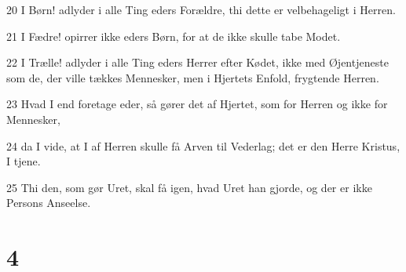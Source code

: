 \par 20 I Børn! adlyder i alle Ting eders Forældre, thi dette er velbehageligt i Herren.
\par 21 I Fædre! opirrer ikke eders Børn, for at de ikke skulle tabe Modet.
\par 22 I Trælle! adlyder i alle Ting eders Herrer efter Kødet, ikke med Øjentjeneste som de, der ville tækkes Mennesker, men i Hjertets Enfold, frygtende Herren.
\par 23 Hvad I end foretage eder, så gører det af Hjertet, som for Herren og ikke for Mennesker,
\par 24 da I vide, at I af Herren skulle få Arven til Vederlag; det er den Herre Kristus, I tjene.
\par 25 Thi den, som gør Uret, skal få igen, hvad Uret han gjorde, og der er ikke Persons Anseelse.

\chapter{4}


